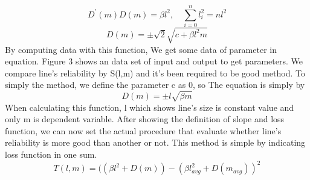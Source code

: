 {\begin{equation}
\mathit{{D}^{\prime}(m)D(m) = \beta{l}^{2},\quad\sum_{i=0}^{n}{{l}_{i}^{2}} = n{l}^{2}}
\end{equation}
\begin{equation}
\mathit{D(m)=\pm\sqrt{2}\sqrt{c+\beta{l}^{2}m}}
\end{equation}
By computing data with this function, We get some data of parameter in equation. Figure 3 shows an data set of input and output to get parameters. We compare line's reliability by S(l,m) and it's been required to be good method. To simply the method, we define the parameter c as 0, so The equation is simply by
\begin{equation}
\mathit{D(m)=\pm l\sqrt{\beta m}}
\end{equation}
When calculating this function, l which shows line's size is constant value and only m is dependent variable. After showing the definition of slope and loss function, we can now set the actual procedure that evaluate whether line's reliability is more good than another or not. This method is simple by indicating loss function in one sum.
\begin{equation}
\mathit{T(l,m) = ((\beta l^{2}+D(m)) - (\beta {l}_{avg}^{2}+D(m_{avg}))^{2}}
\end{equation}
}